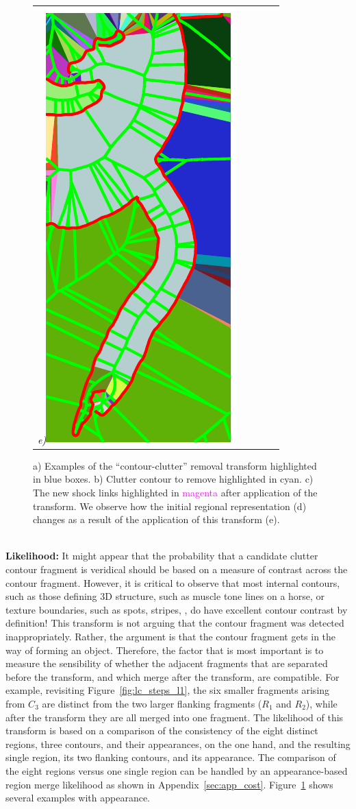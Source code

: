 \begin{figure}[!ht]
\begin{tabular}{ccccc}
    {\footnotesize\textit{\textcolor{black}{e)}}}\includegraphics[height=0.20\linewidth]{figs/n02121620_11528_l1_after_frags.pdf} \\
  \end{tabular}
  
  \caption{ a) Examples of the “contour-clutter” removal transform highlighted in blue boxes. b) Clutter contour to remove highlighted in cyan. c) The new shock links highlighted in \textcolor{magenta}{magenta} after application of the transform. We observe how the initial regional representation (d) changes as a result of the application of this transform (e). }
  \label{fig:real_loop}
\end{figure}



\noindent\\
{\bf Likelihood:} It might appear that the probability that a candidate clutter contour fragment is veridical should be based on a measure of contrast across the contour fragment. However, it is critical to observe that most internal contours, such as those defining 3D structure, such as muscle tone lines on a horse, or texture boundaries, such as spots, stripes, \etc , do have excellent contour contrast by definition! This transform is not arguing that the contour fragment was detected inappropriately. Rather, the argument is that the contour fragment gets in the way of forming an object. Therefore, the factor that is most important is to measure the sensibility of whether the adjacent fragments that are separated before the transform, and which merge after the transform, are compatible. For example, revisiting Figure~\ref{fig:lc_steps_l1}, the six smaller fragments arising from $C_3$ are distinct from the two larger flanking fragments ($R_1$ and $R_2$), while after the transform they are all merged into one fragment. The likelihood of this transform is based on a comparison of the consistency of the eight distinct regions, three contours, and their appearances, on the one hand, and the resulting single region, its two flanking contours, and its appearance. The comparison of the eight regions versus one single region can be handled by an appearance-based region merge likelihood as shown in Appendix~\ref{sec:app_cost}. Figure~\ref{fig:real_loop} shows several examples with appearance. 

